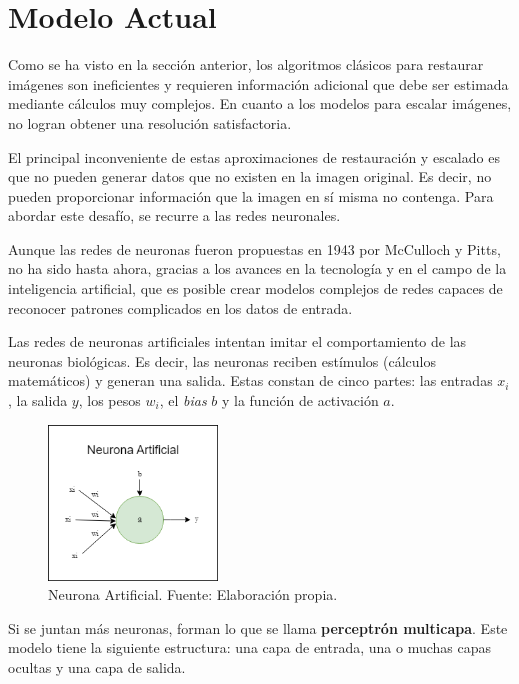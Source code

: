 \section{Modelo Actual}

\quad Como se ha visto en la sección anterior, los algoritmos clásicos para restaurar imágenes son ineficientes y requieren información adicional que debe ser estimada mediante cálculos muy complejos. En cuanto a los modelos para escalar imágenes, no logran obtener una resolución satisfactoria.

El principal inconveniente de estas aproximaciones de restauración y escalado es que no pueden generar datos que no existen en la imagen original. Es decir, no pueden proporcionar información que la imagen en sí misma no contenga. Para abordar este desafío, se recurre a las redes neuronales.

Aunque las redes de neuronas fueron propuestas en 1943 por McCulloch y Pitts\cite{neuronaartificial}, no ha sido hasta ahora, gracias a los avances en la tecnología y en el campo de la inteligencia artificial, que es posible crear modelos complejos de redes capaces de reconocer patrones complicados en los datos de entrada. 

Las redes de neuronas artificiales intentan imitar el comportamiento de las neuronas biológicas. Es decir, las neuronas reciben estímulos (cálculos matemáticos) y generan una salida. Estas constan de cinco partes: las entradas $x_i$, la salida $y$, los pesos $w_i$, el \textit{bias} $b$ y la función de activación $a$\cite{neuronaartificial,neuronaibm}.

\begin{figure}[H]
	\centering
	\includegraphics[width=0.4\textwidth]{figures/neurona_artificial.png}
	\caption{\label{fig:neuronaartificial}Neurona Artificial. Fuente: Elaboración propia.}
\end{figure}

Si se juntan más neuronas, forman lo que se llama \textbf{perceptrón multicapa}. Este modelo tiene la siguiente estructura: una capa de entrada, una o muchas capas ocultas y una capa de salida\cite{neuronaibm}.

